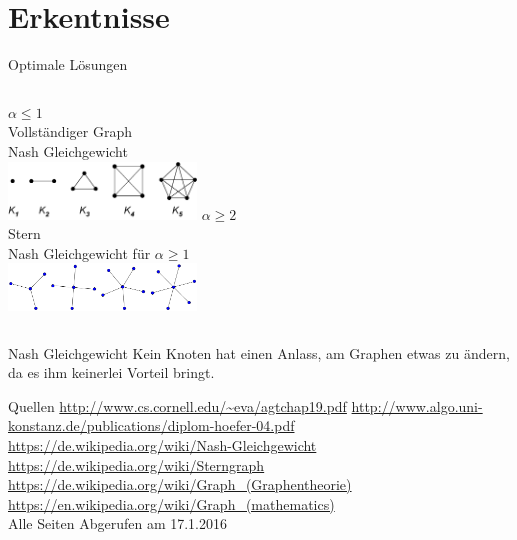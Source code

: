 \documentclass[mathserif, aspectratio=169]{beamer}
\begin{document}
\section{Erkentnisse}
\begin{frame}
{Optimale L\"osungen}
\begin{columns}
\textbf{$\alpha \leq 1$}\\
Vollst\"andiger Graph\\
Nash Gleichgewicht\\
\includegraphics[width=5cm]{pics/Complete_graph_example.png}
\pause
{}
\textbf{$\alpha \geq 2$}\\
Stern\\
Nash Gleichgewicht f\"ur $\alpha \geq 1$ \\
\includegraphics[width=5cm]{pics/star.png}
\end{columns}
\pause
\begin{exampleblock}
{Nash Gleichgewicht}
Kein Knoten hat einen Anlass, am Graphen etwas zu \"andern, da es ihm keinerlei Vorteil bringt.
\end{exampleblock}

\end{frame}
\begin{frame}
{Quellen}
\url{http://www.cs.cornell.edu/~eva/agtchap19.pdf}
\url{http://www.algo.uni-konstanz.de/publications/diplom-hoefer-04.pdf}
\url{https://de.wikipedia.org/wiki/Nash-Gleichgewicht}
\url{https://de.wikipedia.org/wiki/Sterngraph}
\url{https://de.wikipedia.org/wiki/Graph_(Graphentheorie)}\\
\url{https://en.wikipedia.org/wiki/Graph_(mathematics)}\\
Alle Seiten Abgerufen am 17.1.2016
\end{frame}
\end{document}

